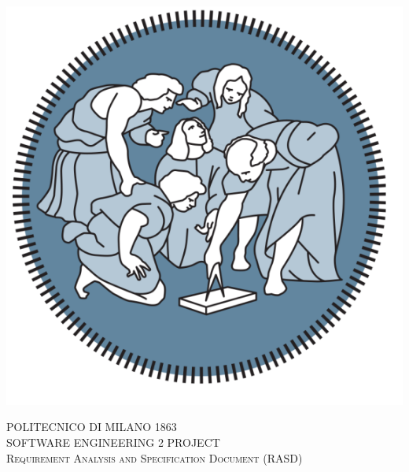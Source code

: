 



\begin{titlepage} %
	\newcommand{\HRule}{\rule{\linewidth}{0.5mm}} %

	\center %

	\begin{center} \includegraphics[scale=0.5]{Images/PolimiLogo1} \end{center}
	\textsc{\LARGE POLITECNICO DI MILANO 1863}\\[2cm]

	\textsc{\Large SOFTWARE ENGINEERING 2 PROJECT }\\[0.5cm]

	\textsc{\large Requirement Analysis and Specification Document (RASD)}\\[0.5cm]



\end{titlepage}
